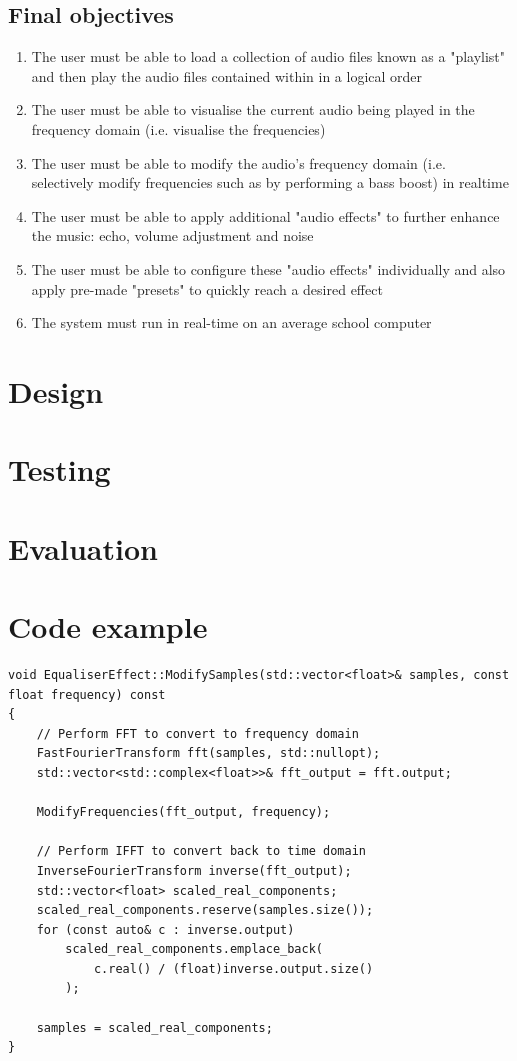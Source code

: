 \documentclass{article}
\begin{document}
	\subsection{Final objectives}
	\begin{enumerate}
	\item  The user must be able to load a collection of audio files known as a "playlist" and then play the audio files contained within in a logical order
	\item  The user must be able to visualise the current audio being played in the frequency domain (i.e. visualise the frequencies)
	\item The user must be able to modify the audio's frequency domain (i.e. selectively modify frequencies such as by performing a bass boost) in realtime
	\item The user must be able to apply additional "audio effects" to further enhance the music: echo, volume adjustment and noise
	\item The user must be able to configure these "audio effects" individually and also apply pre-made "presets" to quickly reach a desired effect
	\item  The system must run in real-time on an average school computer
	\end{enumerate}

	\section { Design }
	\section {  Testing }
	\section {  Evaluation }

	\section { Code example }
		\begin{verbatim}
void EqualiserEffect::ModifySamples(std::vector<float>& samples, const float frequency) const
{
	// Perform FFT to convert to frequency domain
	FastFourierTransform fft(samples, std::nullopt);
	std::vector<std::complex<float>>& fft_output = fft.output;
	
	ModifyFrequencies(fft_output, frequency);
	
	// Perform IFFT to convert back to time domain
	InverseFourierTransform inverse(fft_output);
	std::vector<float> scaled_real_components;
	scaled_real_components.reserve(samples.size());
	for (const auto& c : inverse.output)
		scaled_real_components.emplace_back(
			c.real() / (float)inverse.output.size()
		);
	
	samples = scaled_real_components;
}
	\end{verbatim}
	
	
\end{document}
